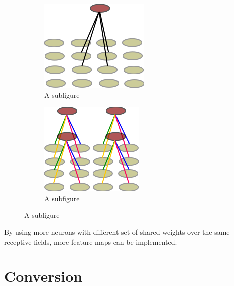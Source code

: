 \begin{figure}
	\centering
	\begin{subfigure}[t]{.5\textwidth}
  		\centering
  		\includegraphics[width=.8\linewidth]{imgs/recpt_field1.png}
  		\caption{A subfigure}
  		\label{fig:sub1}
	\end{subfigure}%
	\begin{subfigure}[t]{.5\textwidth}
  		\centering
  		\includegraphics[width=.8\linewidth]{imgs/recpt_field2.png}
  		\caption{A subfigure}
  		\label{fig:sub2}
	\end{subfigure}
\end{figure}


By using more neurons with different set of shared weights over the same receptive fields, more feature maps can be implemented.     

\section{Conversion}

